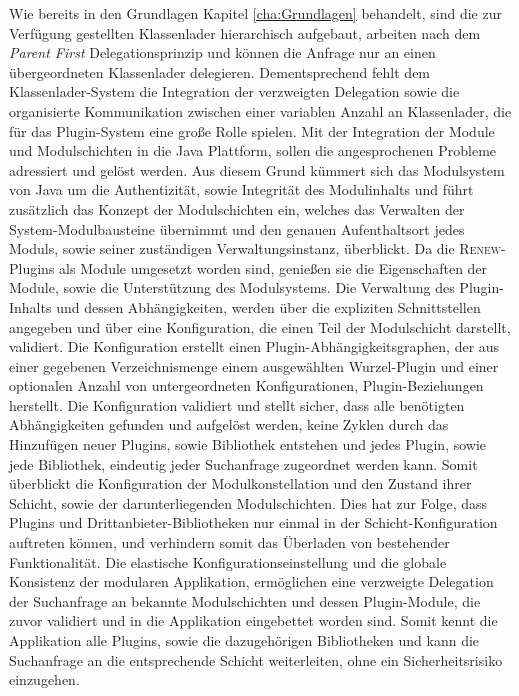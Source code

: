 	Wie bereits in den Grundlagen Kapitel \ref{cha:Grundlagen} behandelt, sind die zur Verfügung gestellten Klassenlader hierarchisch aufgebaut, arbeiten nach dem \textit{Parent First} Delegationsprinzip und können die Anfrage nur an einen übergeordneten Klassenlader delegieren. Dementsprechend fehlt dem Klassenlader-System die Integration der verzweigten Delegation sowie die organisierte Kommunikation zwischen einer variablen Anzahl an Klassenlader, die für das Plugin-System eine große Rolle spielen.\newline
	Mit der Integration der Module und Modulschichten in die Java Plattform, sollen die angesprochenen Probleme adressiert und gelöst werden. Aus diesem Grund kümmert sich das Modulsystem von Java um die Authentizität, sowie Integrität des Modulinhalts und führt zusätzlich das Konzept der Modulschichten ein, welches das Verwalten der System-Modulbausteine übernimmt und den genauen Aufenthaltsort jedes Moduls, sowie seiner zuständigen Verwaltungsinstanz, überblickt. Da die \textsc{Renew}-Plugins als Module umgesetzt worden sind, genießen sie die Eigenschaften der Module, sowie die Unterstützung des Modulsystems.\newline
	Die Verwaltung des Plugin-Inhalts und dessen Abhängigkeiten, werden über die expliziten Schnittstellen angegeben und über eine Konfiguration, die einen Teil der Modulschicht darstellt, validiert. Die Konfiguration erstellt einen Plugin-Abhängigkeitsgraphen, der aus einer gegebenen Verzeichnismenge einem ausgewählten Wurzel-Plugin und einer optionalen Anzahl von untergeordneten Konfigurationen, Plugin-Beziehungen herstellt. Die Konfiguration validiert und stellt sicher, dass alle benötigten Abhängigkeiten gefunden und aufgelöst werden, keine Zyklen durch das Hinzufügen neuer Plugins, sowie Bibliothek entstehen und jedes Plugin, sowie jede Bibliothek, eindeutig jeder Suchanfrage zugeordnet werden kann. Somit überblickt die Konfiguration der Modulkonstellation und den Zustand ihrer Schicht, sowie der darunterliegenden Modulschichten. Dies hat zur Folge, dass Plugins und Drittanbieter-Bibliotheken nur einmal in der Schicht-Konfiguration auftreten können, und verhindern somit das Überladen von bestehender Funktionalität.\newline
	Die elastische Konfigurationseinstellung und die globale Konsistenz der modularen Applikation, ermöglichen eine verzweigte Delegation der Suchanfrage an bekannte Modulschichten und dessen Plugin-Module, die zuvor validiert und in die Applikation eingebettet worden sind. Somit kennt die Applikation alle Plugins, sowie die dazugehörigen Bibliotheken und kann die Suchanfrage an die entsprechende Schicht weiterleiten, ohne ein Sicherheitsrisiko einzugehen.\newline
